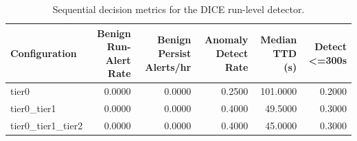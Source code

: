 \begin{table}[t]
\centering
\caption{Sequential decision metrics for the DICE run-level detector.}
\label{tab:dice_sequential_metrics}
\footnotesize
\begin{tabular}{lrrrrr}
\toprule
Configuration & Benign Run-Alert Rate & Benign Persist Alerts/hr & Anomaly Detect Rate & Median TTD (s) & Detect <=300s \\
\midrule
tier0 & 0.0000 & 0.0000 & 0.2500 & 101.0000 & 0.2000 \\
tier0_tier1 & 0.0000 & 0.0000 & 0.4000 & 49.5000 & 0.3000 \\
tier0_tier1_tier2 & 0.0000 & 0.0000 & 0.4000 & 45.0000 & 0.3000 \\
\bottomrule
\end{tabular}

\end{table}
